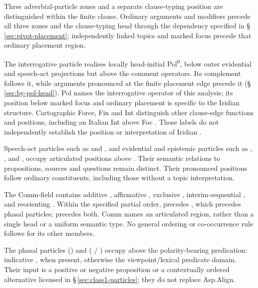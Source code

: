 Three adverbial-particle zones and a separate clause-typing position are
 distinguished within the finite clause. Ordinary arguments and modifiers
 precede all three zones and the clause-typing head through the dependency
 specified in §\,\ref{sec:pivot-placement}; independently linked topics and
 marked focus precede that ordinary placement region.

\begin{description}[leftmargin=2em, labelwidth=!, labelindent=0em]
\item[\upshape Clause typing (\synhead{PolP}).] The interrogative particle
  realises locally head-initial Pol\textsuperscript{0}, below outer
 evidential and speech-act projections but above the comment operators.
 Its complement follows it, while arguments pronounced at the finite
 placement edge precede it (§\,\ref{sec:by-pol-head}). Pol names the
 interrogative operator of this analysis; its position below marked focus and
 ordinary placement is specific to the Iridian structure. Cartographic Force,
 Fin and Int distinguish other clause-edge functions and positions, including
 an Italian Int above Foc \cite[§§2.2--3.1]{rizzibocci2017}. Those labels do
 not independently establish the position or interpretation of Iridian .
\item[\upshape Zone~\textsc{i} (outer evidential and speech-act).]
 Speech-act particles such as  and , and evidential
 and epistemic particles such as , ,  and
 , occupy articulated positions above . Their
 semantic relations to propositions, sources and questions remain distinct.
 Their pronounced positions follow ordinary constituents, including those
 without a topic interpretation.
\item[\upshape Zone~\textsc{ii} (comment-domain).] The Comm-field contains
 additive , affirmative , exclusive ,
 interim-sequential , and reorienting . Within the
 specified partial order,  precedes , which precedes
 phasal particles;  precedes both. Comm names an articulated region,
 rather than a single head or a uniform semantic type. No general ordering
 or co-occurrence rule follows for its other members.
\item[\upshape Zone~\textsc{iii} (phasal).] The phasal particles 
 () and  ( / ) occupy
  above the polarity-bearing predication: indicative
 , when present, otherwise the viewpoint/lexical predicate
 domain. Their input is a positive or negative proposition or a contextually
 ordered alternative licensed in §\,\ref{sec:class1-particles}; they do not
 replace Asp.Align.
\end{description}

